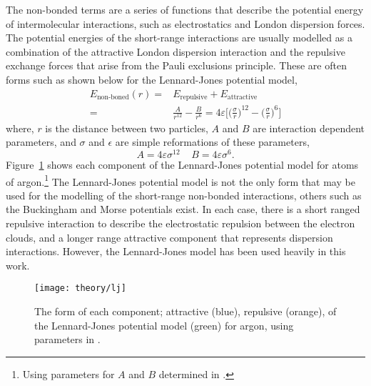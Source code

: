 The non-bonded terms are a series of functions that describe the potential energy of intermolecular interactions, such as electrostatics and London dispersion forces.
The potential energies of the short-range interactions are usually modelled as a combination of the attractive London dispersion interaction and the repulsive exchange forces that arise from the Pauli exclusions principle.
These are often forms such as shown below for the Lennard-Jones potential model,
%
\begin{equation}
\begin{aligned}
  E_{\text{non-boned}}(r) = & E_{\text{repulsive}} + E_{\text{attractive}} \\
  = & \frac{A}{r^{12}} - \frac{B}{r^6} = 4\varepsilon\Bigg[\bigg(\frac{\sigma}{r}\bigg)^{12} - \bigg(\frac{\sigma}{r}\bigg)^6\Bigg]
\end{aligned}
\end{equation}
%
where, $r$ is the distance between two particles, $A$ and $B$ are interaction dependent parameters, and $\sigma$ and $\epsilon$ are simple reformations of these parameters,
%
\begin{equation}
  A = 4\varepsilon\sigma^{12} \;\;\;\; B = 4\varepsilon\sigma^6.
\end{equation}
%
Figure~\ref{fig:lj} shows each component of the Lennard-Jones potential model for atoms of argon.\footnote{Using parameters for $A$ and $B$ determined in \cite{rahman_correlations_1964}.}
The Lennard-Jones potential model is not the only form that may be used for the modelling of the short-range non-bonded interactions, others such as the Buckingham and Morse potentials exist.
In each case, there is a short ranged repulsive interaction to describe the electrostatic repulsion between the electron clouds, and a longer range attractive component that represents dispersion interactions.
However, the Lennard-Jones model has been used heavily in this work.
%
\begin{figure}[t]
    \forceversofloat
    \centering
    \texttt{[image: theory/lj]}
    \caption{The form of each component; attractive (blue), repulsive (orange), of the Lennard-Jones potential model (green) for argon, using parameters in \cite{rahman_correlations_1964}.}
    \label{fig:lj}
\end{figure}
%

